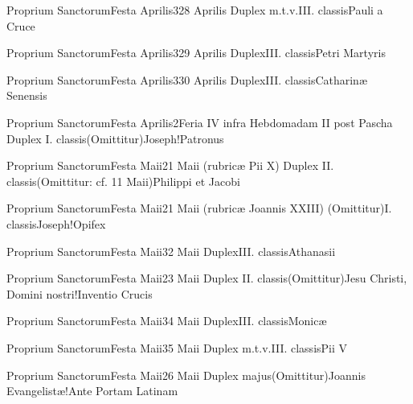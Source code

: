 \documentclass[psalterium-feriale.tex]{subfiles}
\begin{document}
	{Proprium Sanctorum}{Festa Aprilis}{3}{28 Aprilis}
	{Duplex m.t.v.}{III. classis}{Pauli a Cruce}
	{}
	{}
\COPOdRubric

	{Proprium Sanctorum}{Festa Aprilis}{3}{29 Aprilis}
	{Duplex}{III. classis}{Petri Martyris}
	{}
	{}
\UMTPRubric

	{Proprium Sanctorum}{Festa Aprilis}{3}{30 Aprilis}
	{Duplex}{III. classis}{Catharinæ Senensis}
	{}
	{}
\MUVNdRubric

	{Proprium Sanctorum}{Festa Aprilis}{2}{Feria IV infra Hebdomadam II post Pascha}
	{Duplex I. classis}{(Omittitur)}{Joseph!Patronus}
	{}
	{}
\psalmodiapropria


	{Proprium Sanctorum}{Festa Maii}{2}{1 Maii (rubricæ Pii X)}
	{Duplex II. classis}{(Omittitur: cf. 11 Maii)}{Philippi et Jacobi}
	{}
	{}
\psalmodiapropria

	{Proprium Sanctorum}{Festa Maii}{2}{1 Maii (rubricæ Joannis XXIII)}
	{(Omittitur)}{I. classis}{Joseph!Opifex}
	{}
	{}
\psalmodiapropria

	{Proprium Sanctorum}{Festa Maii}{3}{2 Maii}
	{Duplex}{III. classis}{Athanasii}
	{}
	{}
\COPOdRubric

	{Proprium Sanctorum}{Festa Maii}{2}{3 Maii}
	{Duplex II. classis}{(Omittitur)}{Jesu Christi, Domini nostri!Inventio Crucis}
	{}
	{}
\psalmodiapropria

	{Proprium Sanctorum}{Festa Maii}{3}{4 Maii}
	{Duplex}{III. classis}{Monicæ}
	{}
	{}
\MUNNaRubric

	{Proprium Sanctorum}{Festa Maii}{3}{5 Maii}
	{Duplex m.t.v.}{III. classis}{Pii V}
	{}
	{}
\COPOdRubric

	{Proprium Sanctorum}{Festa Maii}{2}{6 Maii}
	{Duplex majus}{(Omittitur)}{Joannis Evangelistæ!Ante Portam Latinam}
	{}
	{}
\psalmodiapropria
\end{document}
